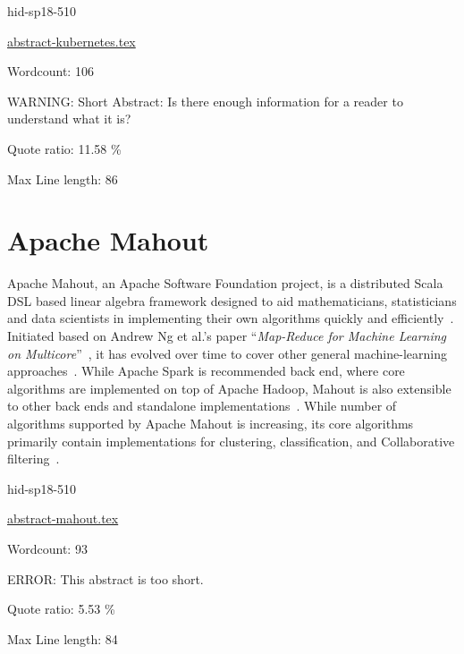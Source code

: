 \begin{IU}

hid-sp18-510

\href{https://github.com/cloudmesh-community/hid-sp18-510/blob/master//technology/abstract-kubernetes.tex}{abstract-kubernetes.tex}

 

Wordcount: 106

WARNING: Short Abstract: Is there enough information for a reader to understand what it is?


Quote ratio: 11.58 \%
 
Max Line length: 86
\end{IU}

\section{Apache Mahout}


Apache Mahout, an Apache Software Foundation project, is a distributed
Scala DSL based linear algebra framework designed to aid
mathematicians, statisticians and data scientists in implementing
their own algorithms quickly and
efficiently~\cite{hid-sp18-510-web-Mahout}. Initiated based on Andrew
Ng et al.'s paper \color{blue}``\emph{Map-Reduce for Machine Learning on
Multicore}''\color{black}~\cite{hid-sp18-510-ng-Mahout}, it has evolved over time to
cover other general machine-learning
approaches~\cite{hid-sp18-510-ibm-Mahout}. While Apache Spark is
recommended back end, where core algorithms are implemented on top of
Apache Hadoop, Mahout is also extensible to other back ends and
standalone implementations~\cite{hid-sp18-510-wiki-Mahout}. While
number of algorithms supported by Apache Mahout is increasing, its
core algorithms primarily contain implementations for clustering,
classification, and Collaborative
filtering~\cite{hid-sp18-510-wiki-Mahout}.


\begin{IU}

hid-sp18-510

\href{https://github.com/cloudmesh-community/hid-sp18-510/blob/master//technology/abstract-mahout.tex}{abstract-mahout.tex}

 

Wordcount: 93

ERROR: This abstract is too short.


Quote ratio: 5.53 \%
 
Max Line length: 84
\end{IU}

